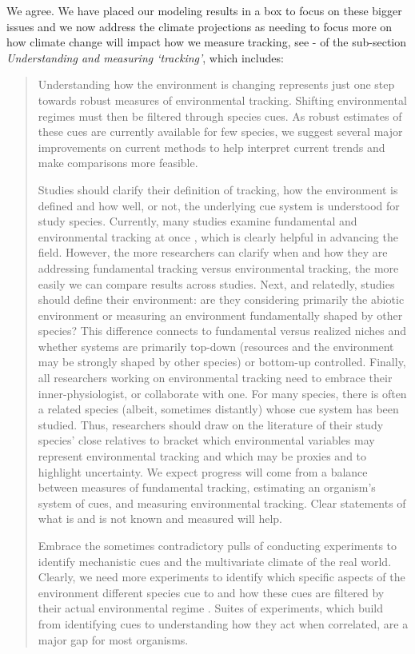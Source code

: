 \documentclass[11pt]{article}
\begin{document}
We agree. We have placed our modeling results in a box to focus on these bigger issues and we now address the climate projections as needing to focus more on how climate change will impact how we measure tracking, see - of the sub-section \emph{Understanding and measuring `tracking'}, which includes:
\begin{quote}
Understanding how the environment is changing represents just one step towards robust measures of environmental tracking. Shifting environmental regimes must then be filtered through species cues. As robust estimates of these cues are currently available for few species, we suggest several major improvements on current methods to help interpret current trends and make comparisons more feasible. 

Studies should clarify their definition of tracking, how the environment is defined and how well, or not, the underlying cue system is understood for study species. Currently, many studies examine fundamental and environmental tracking at once \citep[e.g.,][]{yang2020}, which is clearly helpful in advancing the field. However, the more researchers can clarify when and how they are addressing fundamental tracking versus environmental tracking, the more easily we can compare results across studies. Next, and relatedly, studies should define their environment: are they considering primarily the abiotic environment or measuring an environment fundamentally shaped by other species? This difference connects to fundamental versus realized niches and whether systems are primarily top-down (resources and the environment may be strongly shaped by other species) or bottom-up controlled. Finally, all researchers working on environmental tracking need to embrace their inner-physiologist, or collaborate with one. For many species, there is often a related species (albeit, sometimes distantly) whose cue system has been studied. Thus, researchers should draw on the literature of their study species' close relatives to bracket which environmental variables may represent environmental tracking and which may be proxies and to highlight uncertainty. We expect progress will come from a balance between measures of fundamental tracking, estimating an organism's system of cues, and measuring environmental tracking. Clear statements of what is and is not known and measured will help. 

Embrace the sometimes contradictory pulls of conducting experiments to identify mechanistic cues and the multivariate climate of the real world. Clearly, we need more experiments to identify which specific aspects of the environment different species cue to and how these cues are filtered by their actual environmental regime \citep[as outlined above and see][]{chmura2019}. Suites of experiments, which build from identifying cues to understanding how they act when correlated, are a major gap for most organisms. 
\end{quote}
\end{document}
